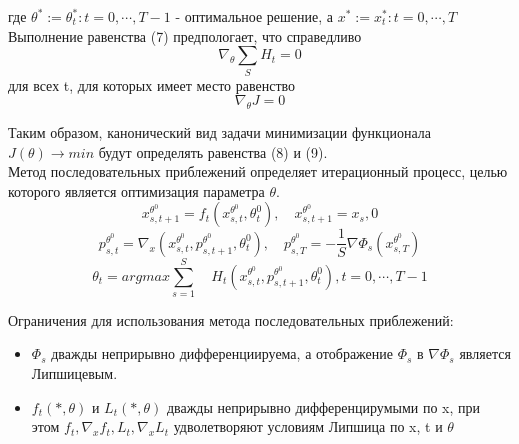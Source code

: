 \documentclass{article}
\begin{document}
где $\theta^*:={\theta_t^*:t=0,\cdots,T-1}$ - оптимальное решение, а $x^*:={x_t^*:t=0,\cdots,T}$\\

Выполнение равенства (7) предпологает, что справедливо
\begin{equation}
\nabla_\theta \sum\limits_{S} H_t = 0
\end{equation} 
для всех t, для которых имеет место равенство 
\begin{equation} \nabla_\theta J = 0 \end{equation}

Таким образом, канонический вид задачи минимизации функционала $J (\theta)\rightarrow min$ будут определять равенства (8) и (9).\\


Метод последовательных приблежений определяет итерационный процесс, целью которого является оптимизация параметра $\theta$.
\begin{equation}
    x_{s,t+1}^{\theta^0} = f_t(x_{s,t}^{\theta^0},\theta_t^0), \quad
    x_{s,t+1}^{\theta^0} = x_s,0
\end{equation}
\begin{equation}
    p_{s,t}^{\theta^0} = \nabla_x( x_{s,t}^{\theta^0}, p_{s,t+1}^{\theta^0}, \theta_t^0),  \quad
    p_{s,T}^{\theta^0} = -\frac1S \nabla \Phi_s(x_{s,T}^{\theta^0})
\end{equation}
\begin{equation}
    \theta_t = argmax \sum\limits_{s=1}^{S} \quad
    H_t(x_{s,t}^{\theta^0},p_{s, t+1}^{\theta^0},\theta_t^0),
    t=0,\cdots,T-1
\end{equation}

Ограничения для использования метода последовательных приблежений:
\begin{itemize}
\item $\Phi_s$ дважды неприрывно дифференциируема, а отображение $\Phi_s$ в $\nabla \Phi_s$ является Липшицевым.
\item  $f_t(*,\theta)$ и $L_t(*,\theta)$ дважды неприрывно дифференцирумыми по x, при этом 
$f_t,\nabla_x f_t,L_t,\nabla_x L_t $ удволетворяют условиям Липшица  по  x, t и $\theta$

\end{itemize}
\end{document}
